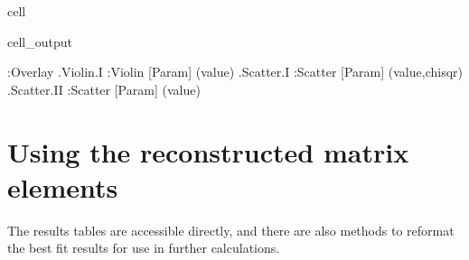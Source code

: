 \documentclass[letterpaper,table,10pt,english]{jupyterBook}
\begin{document}
\begin{sphinxuseclass}{cell}
\begin{sphinxVerbatimOutput}
\begin{sphinxuseclass}{cell_output}
\begin{sphinxVerbatim}[commandchars=\\\{\}]
:Overlay
   .Violin.I   :Violin   [Param]   (value)
   .Scatter.I  :Scatter   [Param]   (value,chisqr)
   .Scatter.II :Scatter   [Param]   (value)
\end{sphinxVerbatim}

\end{sphinxuseclass}\end{sphinxVerbatimOutput}

\end{sphinxuseclass}

\section{Using the reconstructed matrix elements}
\label{\detokenize{part2/case-study-OCS_290723:using-the-reconstructed-matrix-elements}}
\sphinxAtStartPar
The results tables are accessible directly, and there are also methods to reformat the best fit results for use in further calculations.
\end{document}
